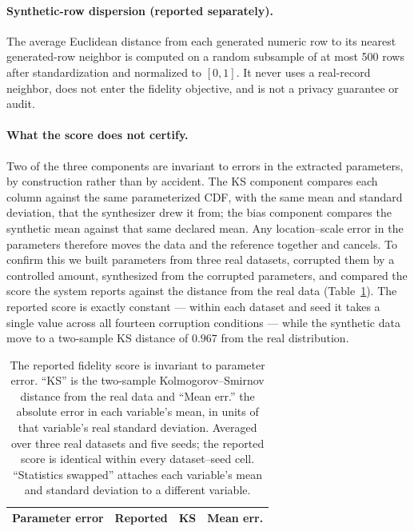 \documentclass[letterpaper]{article} %
\begin{document}
\paragraph{Synthetic-row dispersion (reported separately).} The average
Euclidean distance from each generated numeric row to its nearest generated-row
neighbor is computed on a random subsample of at most 500 rows after
standardization and normalized to $[0,1]$. It never uses a real-record neighbor,
does not enter the fidelity objective, and is not a privacy guarantee or audit.

\paragraph{What the score does not certify.}
Two of the three components are invariant to errors in the extracted
parameters, by construction rather than by accident. The KS component compares
each column against the same parameterized CDF, with the same mean and standard
deviation, that the synthesizer drew it from; the bias component compares the
synthetic mean against that same declared mean. Any location--scale error in
the parameters therefore moves the data and the reference together and cancels.
To confirm this we built parameters from three real datasets, corrupted them by
a controlled amount, synthesized from the corrupted parameters, and compared the
score the system reports against the distance from the real data
(Table~\ref{tab:validity}). The reported score is exactly constant --- within
each dataset and seed it takes a single value across all fourteen corruption
conditions --- while the synthetic data move to a two-sample KS distance of
$0.967$ from the real distribution.

\begin{table}[t]
\centering
\setlength{\tabcolsep}{4pt}
\begin{tabular}{lrrr}
\toprule
Parameter error & Reported & KS & Mean err. \\
\midrule
%
\end{tabular}
\caption{The reported fidelity score is invariant to parameter error. ``KS'' is
the two-sample Kolmogorov--Smirnov distance from the real data and ``Mean
err.'' the absolute error in each variable's mean, in units of that variable's
real standard deviation. Averaged over three real datasets and five seeds; the
reported score is identical within every dataset--seed cell. ``Statistics
swapped'' attaches each variable's mean and standard deviation to a different
variable.}
\label{tab:validity}
\end{table}
\end{document}
